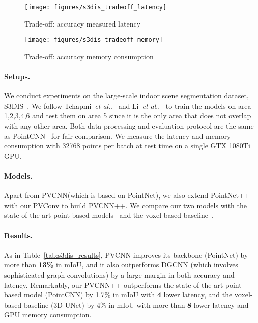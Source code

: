 \documentclass{article}
\makeatletter
\newcommand{\tab}[1]{Table~\ref{#1}}
\DeclareRobustCommand\onedot{\futurelet\@let@token\@onedot}
\def\@onedot{\ifx\@let@token.\else.\null\fi\xspace}
\def\etal{\emph{et al}\onedot}
\newcommand{\myparagraph}[1]{\vspace{-6pt}\paragraph{#1}}
\def\modelshort{PVCNN\xspace}
\def\modelshortp{PVCNN++\xspace}
\def\convshort{PVConv\xspace}
\makeatother
\begin{document}
\begin{table*}[t]
\end{table*} \begin{figure*}[!t]
\centering
\begin{subfigure}{0.49\textwidth}
    \centering
    \texttt{[image: figures/s3dis\_tradeoff\_latency]}
    \caption{Trade-off: accuracy \vs measured latency}
\end{subfigure}
\hfill
\begin{subfigure}{0.49\textwidth}
    \centering
    \texttt{[image: figures/s3dis\_tradeoff\_memory]}
    \caption{Trade-off: accuracy \vs memory consumption}
\end{subfigure}
\caption{Comparisons between \modelshort and point/voxel-based baselines on S3DIS.}
\label{fig:s3dis_tradeoffs}
\vspace{-10pt}
\end{figure*}
 
\paragraph{Setups.}

We conduct experiments on the large-scale indoor scene segmentation dataset, S3DIS~\cite{Armeni:2017is,Armeni:2016sd}. We follow Tchapmi~\etal~\cite{Tchapmi:2017sc} and Li~\etal~\cite{Li:2018tp} to train the models on area 1,2,3,4,6 and test them on area 5 since it is the only area that does not overlap with any other area. Both data processing and evaluation protocol are the same as PointCNN~\cite{Li:2018tp} for fair comparison. We measure the latency and memory consumption with 32768 points per batch at test time on a single GTX 1080Ti GPU.

\myparagraph{Models.}

Apart from \modelshort (which is based on PointNet), we also extend PointNet++~\cite{Qi:2017tf} with our \convshort to build \modelshortp. We compare our two models with the state-of-the-art point-based models~\cite{Qi:2017vq,Huang:2018rs, Wang:2018dg, Li:2018tp} and the voxel-based baseline~\cite{Cicek:2016un}.

\myparagraph{Results.}

As in \tab{tab:s3dis_results}, \modelshort improves its backbone (PointNet) by more than \textbf{13\%} in mIoU, and it also outperforms DGCNN (which involves sophisticated graph convolutions) by a large margin in both accuracy and latency. Remarkably, our \modelshortp outperforms the state-of-the-art point-based model (PointCNN) by 1.7\% in mIoU with \textbf{4} lower latency, and the voxel-based baseline (3D-UNet) by 4\% in mIoU with more than \textbf{8} lower latency and GPU memory consumption.
\end{document}
